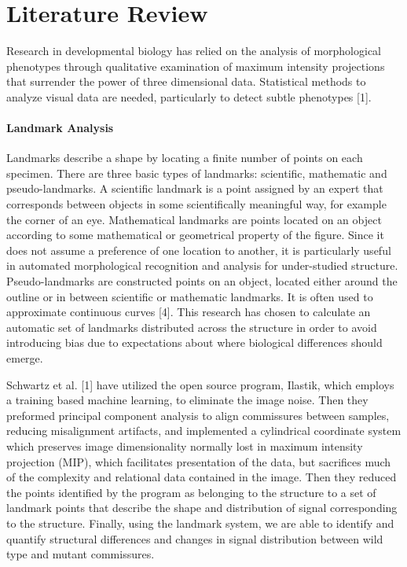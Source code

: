\documentclass[10pt,letterpaper]{article}
\begin{document}
\section{Literature Review}\label{literature-review}

Research in developmental biology has relied on the analysis of
morphological phenotypes through qualitative examination of maximum
intensity projections that surrender the power of three dimensional
data. Statistical methods to analyze visual data are needed,
particularly to detect subtle phenotypes {[}1{]}.

\paragraph{Landmark Analysis}\label{landmark-analysis}

Landmarks describe a shape by locating a finite number of points on each
specimen. There are three basic types of landmarks: scientific,
mathematic and pseudo-landmarks. A scientific landmark is a point
assigned by an expert that corresponds between objects in some
scientifically meaningful way, for example the corner of an eye.
Mathematical landmarks are points located on an object according to some
mathematical or geometrical property of the figure. Since it does not
assume a preference of one location to another, it is particularly
useful in automated morphological recognition and analysis for
under-studied structure. Pseudo-landmarks are constructed points on an
object, located either around the outline or in between scientific or
mathematic landmarks. It is often used to approximate continuous curves
{[}4{]}. This research has chosen to calculate an automatic set of
landmarks distributed across the structure in order to avoid introducing
bias due to expectations about where biological differences should
emerge.

Schwartz et al. {[}1{]} have utilized the open source program, Ilastik,
which employs a training based machine learning, to eliminate the image
noise. Then they preformed principal component analysis to align
commissures between samples, reducing misalignment artifacts, and
implemented a cylindrical coordinate system which preserves image
dimensionality normally lost in maximum intensity projection (MIP),
which facilitates presentation of the data, but sacrifices much of the
complexity and relational data contained in the image. Then they reduced
the points identified by the program as belonging to the structure to a
set of landmark points that describe the shape and distribution of
signal corresponding to the structure. Finally, using the landmark
system, we are able to identify and quantify structural differences and
changes in signal distribution between wild type and mutant commissures.
\end{document}
